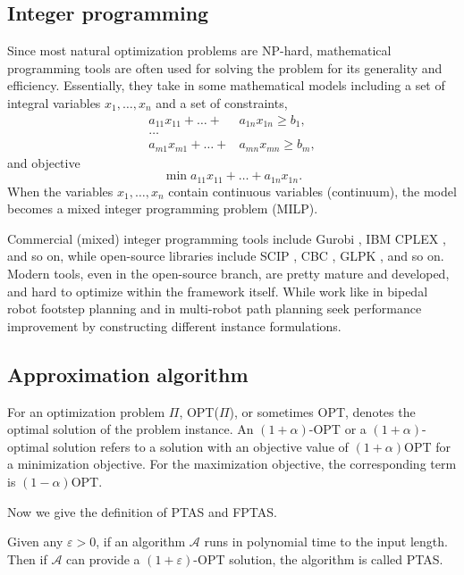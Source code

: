 \subsection{Integer programming}
Since most natural optimization problems are NP-hard, mathematical programming tools are often 
used for solving the problem for its generality and efficiency. Essentially, they take in
some mathematical models including a set of integral variables $x_1, \dots, x_n$ and a set of constraints,
\begin{align*}
    a_{11} x_{11} + \dots + & a_{1n} x_{1n} \geq b_1,\\
    \dots & \\
    a_{m1} x_{m1} + \dots + & a_{mn} x_{mn} \geq b_m,
\end{align*}
and objective 
\[
    \min a_{11} x_{11} + \dots + a_{1n} x_{1n}.
\]
When the variables $x_1, \dots, x_n$ contain continuous variables (continuum), the model becomes a mixed integer programming problem (MILP).

Commercial (mixed) integer programming tools include Gurobi \cite{optimization2019gurobi}, IBM CPLEX \cite{cplex2009v12}, and so on,
while open-source libraries include SCIP \cite{achterberg2009scip}, CBC \cite{forrest2005cbc}, GLPK \cite{makhorin2008glpk}, and so on. 
Modern tools, even in the open-source branch, are pretty mature and developed, and hard to optimize within the framework itself. 
While work like \cite{deits2014footstep} in bipedal robot footstep planning and \cite{guo2021spatial} in multi-robot path planning 
seek performance improvement by constructing different instance formulations.

\subsection{Approximation algorithm}
For an optimization problem $\Pi$, OPT($\Pi$), or sometimes OPT, 
denotes the optimal solution of the problem instance. An $(1+\alpha)$-OPT or a $(1+\alpha)$-optimal solution refers
to a solution with an objective value of $(1+\alpha)$OPT for a minimization objective. For the maximization objective,
the corresponding term is $(1-\alpha)$OPT.

Now we give the definition of PTAS and FPTAS.
\begin{definition}
    Given any $\varepsilon>0$, if an algorithm $\mathcal A$ runs in polynomial time to the input length. 
    Then if $\mathcal A$ can provide a $(1+\varepsilon)$-OPT solution, the algorithm is called PTAS.
\end{definition}

